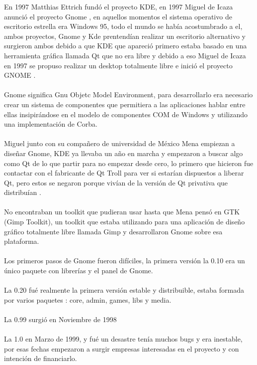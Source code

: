 \documentclass[a4paper,oneside,11pt]{article}
\begin{document}
En 1997 Matthias Ettrich fund\'o el proyecto KDE, en 1997 Miguel de Icaza anunci\'o el 
proyecto Gnome , en aquellos momentos el sistema operativo de escritorio estrella
era Windows 95, todo el mundo se hab\'ia acostumbrado a el, ambos proyectos, Gnome
y Kde prentend\'ian realizar un escritorio alternativo y surgieron ambos debido a que
KDE que apareci\'o primero estaba basado en una herramienta gr\'afica llamada Qt que no 
era libre y debido a eso Miguel de Icaza en 1997 se propuso realizar un desktop totalmente
libre e inici\'o el proyecto GNOME .
\\\\
Gnome significa Gnu Objetc Model Environment, para desarrollarlo era necesario crear
un sistema de componentes que permitiera a las aplicaciones hablar entre ellas insipir\'andose
en el modelo de componentes COM de Windows y utilizando una implementaci\'on de Corba.
\\\\
Miguel junto con su compañero de universidad de M\'exico Mena empiezan a diseñar Gnome,
KDE ya llevaba un año en marcha y empezaron a buscar algo como Qt de lo que partir para no
empezar desde cero, lo primero que hicieron fue contactar con el fabricante de Qt Troll
para ver si estar\'ian dispuestos a liberar Qt, pero estos se negaron porque viv\'ian
de la versi\'on de Qt privativa que distribu\'ian .
\\\\
No encontraban un toolkit que pudieran usar hasta que Mena pens\'o en GTK (Gimp Toolkit), un toolkit que 
estaba utilizando para una aplicaci\'on de diseño gr\'afico totalmente libre llamada Gimp
y desarrollaron Gnome sobre esa plataforma.
\\\\
Los primeros pasos de Gnome fueron dif\'iciles, la primera versi\'on la 0.10 era un
\'unico paquete con librer\'ias y el panel de Gnome.
\\\\
La 0.20 fu\'e realmente la primera versi\'on estable y distribuible, estaba formada por
varios paquetes : core, admin, games, libs y media.
\\\\
La 0.99 surgi\'o en Noviembre de 1998
\\\\
La 1.0 en Marzo de 1999, y fu\'e un desastre ten\'ia muchos bugs y era inestable, por
esas fechas empezaron a surgir empresas interesadas en el proyecto y con intenci\'on de 
financiarlo.
\\\\
\end{document}

